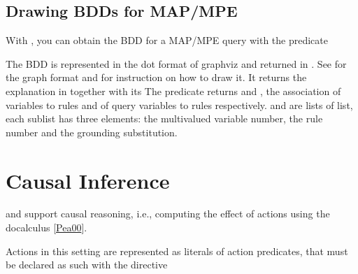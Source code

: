 \documentclass[letterpaper,10pt,english]{sphinxmanual}
\begin{document}
\subsection{Drawing BDDs for MAP/MPE}
\label{\detokenize{index:drawing-bdds-for-map-mpe}}
\sphinxAtStartPar
With , you can obtain the BDD for a MAP/MPE query with the predicate

\begin{sphinxVerbatim}[commandchars=\\\{\}]
          
\end{sphinxVerbatim}

\sphinxAtStartPar
The BDD is represented in the dot format of graphviz and returned in . See {\hyperref[\detokenize{index:drawing-bdds}]{}}
for the graph format and for instruction on how to draw it.
It returns the explanation in  together with its 
The predicate returns  and , the association of variables to rules
and of query variables to rules respectively.
 and  are lists of list, each sublist has three elements:
the multivalued variable number,
the rule number and the grounding substitution.


\section{Causal Inference}
\label{\detokenize{index:causal-inference}}
\sphinxAtStartPar
{} and  support causal reasoning, i.e., computing the effect of actions using the do\sphinxhyphen{}calculus {[}\hyperlink{cite.index:id57}{Pea00}{]}.

\sphinxAtStartPar
Actions in this setting are represented as literals of action predicates, that must be declared as such with the directive
\end{document}
